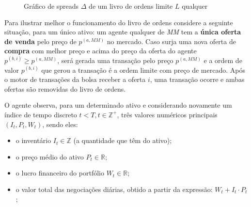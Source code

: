 \begin{figure}[H]
	\begin{center}
	\end{center}
	\caption{Gráfico de spreads $\Delta$ de um livro de ordens limite $L$ qualquer}
\end{figure}

Para ilustrar melhor o funcionamento do livro de ordens considere a seguinte situação, para um único ativo: um agente qualquer de \textit{MM} tem a \textbf{única oferta de venda} pelo preço de $p^{(a, MM)}$ no mercado. Caso surja uma nova oferta de \textbf{compra} com melhor preço e acima do preço da oferta do agente $p^{(b, i)} \geq p^{(a, MM)}$, será gerada uma transação pelo preço $p^{(a, MM)}$ e a ordem de valor $p^{(b, i)}$ que gerou a transação é a ordem limite com preço de mercado. Após o motor de transações da bolsa receber a oferta $i$, uma transação ocorre e ambas ofertas são removidas do livro de ordens. 

O agente observa, para um determinado ativo e considerando novamente um índice de tempo discreto $t < T, t \in \mathbb{Z^{+}}$, três valores numéricos principais $(I_{t}, P_{t}, W_{t})$, sendo eles: 
\begin{itemize}
	\item o inventário $I_{t} \in \mathbb{Z}$ (a quantidade que têm do ativo);
	\item o preço médio do ativo $P_{t} \in \mathbb{R}$;
	\item o lucro financeiro do portfólio $W_{t} \in \mathbb{R}$;
	\item o valor total das negociações diárias, obtido a partir da expressão: $W_{t} + I_{t} \cdot P_{t}$;
\end{itemize}

